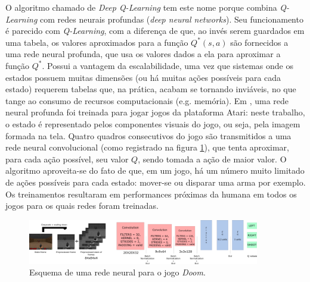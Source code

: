 \documentclass[cic,tc]{iiufrgs}
\begin{document}
O algoritmo chamado de \textit{Deep Q-Learning} tem este nome porque combina
\textit{Q-Learning} com redes neurais profundas (\textit{deep neural networks}).
Seu funcionamento é parecido com \textit{Q-Learning}, com a diferença de que, ao
invés serem guardados em uma tabela, os valores aproximados para a função
$Q^*(s, a)$ são fornecidos a uma rede neural profunda, que usa os valores
dados a ela para aproximar a função $Q^*$. Possui a vantagem da escalabilidade,
uma vez que sistemas onde os estados possuem muitas dimensões (ou há muitas
ações possíveis para cada estado) requerem tabelas que, na prática, acabam se
tornando inviáveis, no que tange ao consumo de recursos computacionais (e.g.
memória). Em \cite{atari2013}, uma rede neural profunda foi treinada para jogar jogos da
plataforma Atari: neste trabalho, o estado é representado pelos componentes
visuais do jogo, ou seja, pela imagem formada na tela. Quatro quadros
consecutivos do jogo são transmitidos a uma rede neural convolucional \cite{NIPS2012_4824}
(como registrado na figura \ref{fig:doom_neural_network}), que
tenta aproximar, para cada ação possível, seu valor $Q$, sendo tomada a ação de
maior valor. O algoritmo aproveita-se do fato de que, em um jogo, há um número
muito limitado de ações possíveis para cada estado: mover-se ou disparar uma
arma por exemplo. Os treinamentos resultaram em performances próximas da humana
em todos os jogos para os quais redes foram treinadas.

\begin{figure}[h]
    \caption{Esquema de uma rede neural para o jogo \textit{Doom}.}
    \begin{center}
      \includegraphics[width=0.9\textwidth]{cnn_doom.png}
    \end{center}
    \label{fig:doom_neural_network}
\end{figure}
\end{document}
